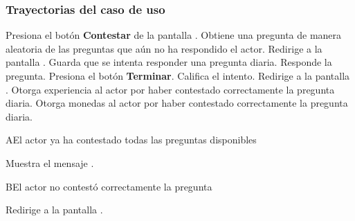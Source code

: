 \subsubsection{Trayectorias del caso de uso}

\begin{UCtrayectoria}%
%
    \Actor Presiona el botón {\bf Contestar} de la pantalla .
    \Sistema Obtiene una pregunta de manera aleatoria de las preguntas que aún no ha respondido el actor. 
    \Sistema Redirige a la pantalla .
    \Sistema Guarda que se intenta responder una pregunta diaria.
    \Actor Responde la pregunta.
    \Actor Presiona el botón {\bf Terminar}.
    \Sistema Califica el intento. 
    \Sistema Redirige a la pantalla .
    \Sistema Otorga experiencia al actor por haber contestado correctamente la pregunta diaria.
    \Sistema Otorga monedas al actor por haber contestado correctamente la pregunta diaria.


\end{UCtrayectoria}



\begin{UCtrayectoriaA}{A}{El actor ya ha contestado todas las preguntas disponibles}

  \Sistema Muestra el mensaje .

\end{UCtrayectoriaA}


\begin{UCtrayectoriaA}{B}{El actor no contestó correctamente la pregunta}

    \Sistema Redirige a la pantalla .

\end{UCtrayectoriaA}
